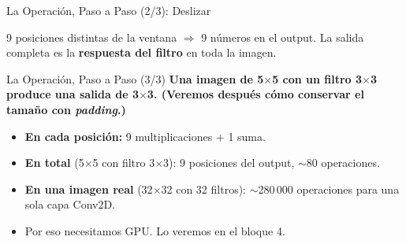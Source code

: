 \documentclass[aspectratio=169, 11pt]{beamer}
\begin{document}
\begin{frame}[shrink]{La Operaci\'on, Paso a Paso (2/3): Deslizar}
\begin{center}
  \end{center}

  \vspace{6pt}
  {\scriptsize\color{textMuted}
    \faLightbulb\hspace{4pt} 9 posiciones distintas de la ventana
    $\Rightarrow$ 9 n\'umeros en el output. La salida completa es la
    \textbf{respuesta del filtro} en toda la imagen.}
\end{frame}

\begin{frame}[shrink]{La Operaci\'on, Paso a Paso (3/3)}
  \vspace{4pt}
  {\footnotesize\color{arcaDark}\bfseries
    Una imagen de \textbf{5$\times$5} con un filtro \textbf{3$\times$3}
    produce una salida de \textbf{3$\times$3}. (Veremos despu\'es c\'omo
    conservar el tama\~no con \emph{padding}.)}

  \vspace{14pt}
  {\footnotesize
  \begin{itemize}\setlength{\itemsep}{6pt}
    \item[{\color{arcaRed}\scriptsize\faArrowRight}]
      \textbf{En cada posici\'on:} 9 multiplicaciones + 1 suma.
    \item[{\color{arcaRed}\scriptsize\faArrowRight}]
      \textbf{En total} (5$\times$5 con filtro 3$\times$3): 9 posiciones
      del output, $\sim$80 operaciones.
    \item[{\color{arcaRed}\scriptsize\faArrowRight}]
      \textbf{En una imagen real} (32$\times$32 con 32 filtros):
      $\sim$280\,000 operaciones para una sola capa Conv2D.
    \item[{\color{codeGreen}\scriptsize\faArrowRight}]
      Por eso necesitamos GPU. Lo veremos en el bloque 4.
  \end{itemize}
  }
\end{frame}
\end{document}
